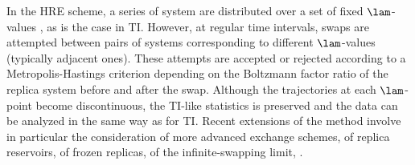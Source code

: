 In the HRE scheme\cite{SU99.1,FU02.2,ZH16.2}, a series of system 
are distributed over a set of fixed $\lam$-values , 
as is the case in TI. However, at regular time intervals, swaps are attempted 
between pairs of systems corresponding to different $\lam$-values (typically adjacent ones).
These attempts are accepted or rejected according to a Metropolis-Hastings criterion\cite{ME53.1,HA70.4} depending on the Boltzmann factor ratio of the replica system before and after the swap. Although the trajectories at each $\lam$-point become discontinuous, the TI-like statistics is preserved and the data can be analyzed in the same way as for TI. Recent extensions of the method involve in particular the consideration 
of 
%
more advanced exchange schemes\cite{CA05.6,BR07.6,CH11.9}, 
%
%
of replica reservoirs\cite{LI06.11,OK07.4,RO07.14,RU10.2,OK13.1,HE13.6,DA18.6},
%
of frozen replicas\cite{CH15.28,CH16.21},
%
%
%
%
%
of the infinite-swapping limit\cite{SI08.3,PL11.4,DU12.3,PL13.3,LU13.4,ZH16.2},
%
.

